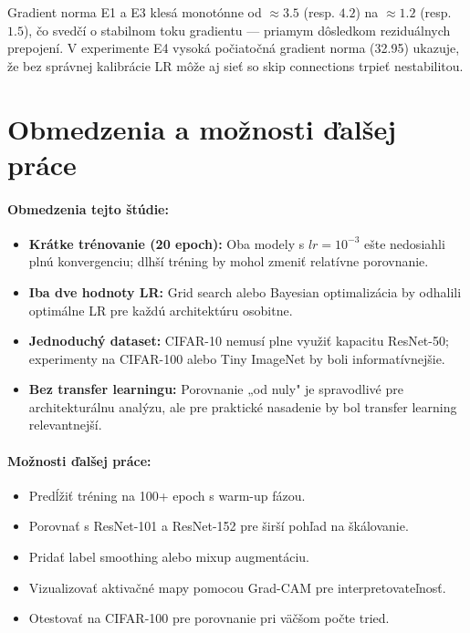 \documentclass[12pt,a4paper]{article}
\begin{document}
Gradient norma E1 a E3 klesá monotónne od $\approx 3.5$ (resp. $4.2$) na $\approx 1.2$
(resp. $1.5$), čo svedčí o stabilnom toku gradientu — priamym dôsledkom reziduálnych
prepojení. V experimente E4 vysoká počiatočná gradient norma (32.95) ukazuje, že bez
správnej kalibrácie LR môže aj sieť so skip connections trpieť nestabilitou.

\section{Obmedzenia a možnosti ďalšej práce}

\paragraph{Obmedzenia tejto štúdie:}
\begin{itemize}
  \item \textbf{Krátke trénovanie (20 epoch):} Oba modely s $lr = 10^{-3}$ ešte
        nedosiahli plnú konvergenciu; dlhší tréning by mohol zmeniť relatívne porovnanie.
  \item \textbf{Iba dve hodnoty LR:} Grid search alebo Bayesian optimalizácia
        by odhalili optimálne LR pre každú architektúru osobitne.
  \item \textbf{Jednoduchý dataset:} CIFAR-10 nemusí plne využiť kapacitu ResNet-50;
        experimenty na CIFAR-100 alebo Tiny ImageNet by boli informatívnejšie.
  \item \textbf{Bez transfer learningu:} Porovnanie „od nuly" je spravodlivé
        pre architekturálnu analýzu, ale pre praktické nasadenie by bol transfer
        learning relevantnejší.
\end{itemize}

\paragraph{Možnosti ďalšej práce:}
\begin{itemize}
  \item Predĺžiť tréning na 100+ epoch s warm-up fázou.
  \item Porovnať s ResNet-101 a ResNet-152 pre širší pohľad na škálovanie.
  \item Pridať label smoothing alebo mixup augmentáciu.
  \item Vizualizovať aktivačné mapy pomocou Grad-CAM pre interpretovateľnosť.
  \item Otestovať na CIFAR-100 pre porovnanie pri väčšom počte tried.
\end{itemize}
\end{document}
